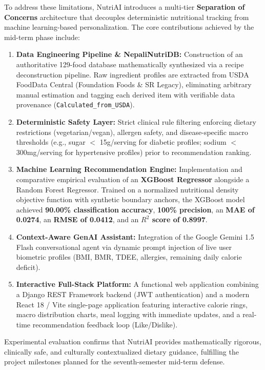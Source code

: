 \documentclass[12pt,a4paper]{report}
\begin{document}
To address these limitations, NutriAI introduces a multi-tier \textbf{Separation of Concerns} architecture that decouples deterministic nutritional tracking from machine learning-based personalization. The core contributions achieved by the mid-term phase include:
\begin{enumerate}[leftmargin=*]
  \item \textbf{Data Engineering Pipeline \& NepaliNutriDB:} Construction of an authoritative 129-food database mathematically synthesized via a recipe deconstruction pipeline. Raw ingredient profiles are extracted from USDA FoodData Central (Foundation Foods \& SR Legacy), eliminating arbitrary manual estimation and tagging each derived item with verifiable data provenance (\texttt{Calculated\_from\_USDA}).
  \item \textbf{Deterministic Safety Layer:} Strict clinical rule filtering enforcing dietary restrictions (vegetarian/vegan), allergen safety, and disease-specific macro thresholds (e.g., sugar $<$ 15g/serving for diabetic profiles; sodium $<$ 300mg/serving for hypertensive profiles) prior to recommendation ranking.
  \item \textbf{Machine Learning Recommendation Engine:} Implementation and comparative empirical evaluation of an \textbf{XGBoost Regressor} alongside a Random Forest Regressor. Trained on a normalized nutritional density objective function with synthetic boundary anchors, the XGBoost model achieved \textbf{90.00\% classification accuracy}, \textbf{100\% precision}, an \textbf{MAE of 0.0274}, an \textbf{RMSE of 0.0412}, and an \textbf{$R^2$ score of 0.8997}.
  \item \textbf{Context-Aware GenAI Assistant:} Integration of the Google Gemini 1.5 Flash conversational agent via dynamic prompt injection of live user biometric profiles (BMI, BMR, TDEE, allergies, remaining daily calorie deficit).
  \item \textbf{Interactive Full-Stack Platform:} A functional web application combining a Django REST Framework backend (JWT authentication) and a modern React 18 / Vite single-page application featuring interactive calorie rings, macro distribution charts, meal logging with immediate updates, and a real-time recommendation feedback loop (Like/Dislike).
\end{enumerate}

Experimental evaluation confirms that NutriAI provides mathematically rigorous, clinically safe, and culturally contextualized dietary guidance, fulfilling the project milestones planned for the seventh-semester mid-term defense.
\end{document}
